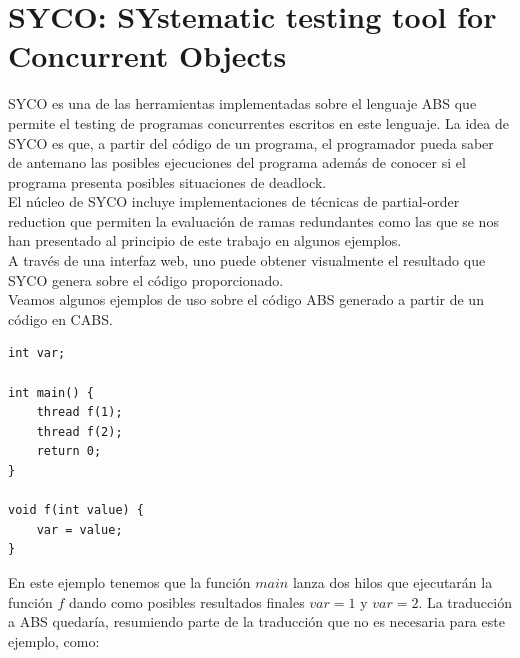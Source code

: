 \chapter{SYCO: SYstematic testing tool for Concurrent Objects}

SYCO es una de las herramientas implementadas sobre el lenguaje ABS que permite el testing de programas concurrentes escritos en este lenguaje. La idea de SYCO es que, a partir del código de un programa, el programador pueda saber de antemano las posibles ejecuciones del programa además de conocer si el programa presenta posibles situaciones de deadlock.\\

El núcleo de SYCO incluye implementaciones de técnicas de partial-order reduction que permiten la evaluación de ramas redundantes como las que se nos han presentado al principio de este trabajo en algunos ejemplos.\\

A través de una interfaz web, uno puede obtener visualmente el resultado que SYCO genera sobre el código proporcionado.\\

Veamos algunos ejemplos de uso sobre el código ABS generado a partir de un código en CABS.\\

\begin{lstlisting}
int var;

int main() {
    thread f(1);
    thread f(2);
    return 0;
}

void f(int value) {
    var = value;
}
\end{lstlisting}

En este ejemplo tenemos que la función $main$ lanza dos hilos que ejecutarán la función $f$ dando como posibles resultados finales $var = 1$ y $var = 2$. La traducción a ABS quedaría, resumiendo parte de la traducción que no es necesaria para este ejemplo, como:

